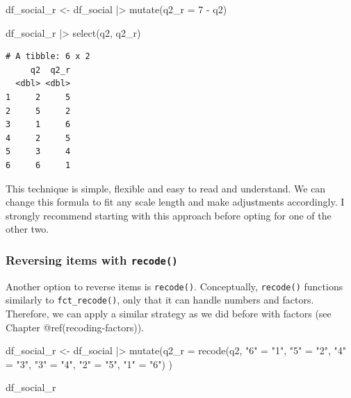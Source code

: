 \documentclass[
  letterpaper,
]{krantz}
\makeatletter
\newenvironment{Shaded}{\begin{snugshade}}{\end{snugshade}}
\newcommand{\AttributeTok}[1]{\textcolor[rgb]{0.40,0.45,0.13}{#1}}
\newcommand{\DecValTok}[1]{\textcolor[rgb]{0.68,0.00,0.00}{#1}}
\newcommand{\FunctionTok}[1]{\textcolor[rgb]{0.28,0.35,0.67}{#1}}
\newcommand{\NormalTok}[1]{\textcolor[rgb]{0.00,0.23,0.31}{#1}}
\newcommand{\OtherTok}[1]{\textcolor[rgb]{0.00,0.23,0.31}{#1}}
\newcommand{\SpecialCharTok}[1]{\textcolor[rgb]{0.37,0.37,0.37}{#1}}
\newcommand{\StringTok}[1]{\textcolor[rgb]{0.13,0.47,0.30}{#1}}
\newenvironment{kframe}{%
\medskip{}
\setlength{\fboxsep}{.8em}
 \def\at@end@of@kframe{}%
 \ifinner\ifhmode%
  \def\at@end@of@kframe{\end{minipage}}%
  \begin{minipage}{\columnwidth}%
 \fi\fi%
 \def\FrameCommand##1{\hskip\@totalleftmargin \hskip-\fboxsep
 \colorbox{shadecolor}{##1}\hskip-\fboxsep
     \hskip-\linewidth \hskip-\@totalleftmargin \hskip\columnwidth}%
 \MakeFramed {\advance\hsize-\width
   \@totalleftmargin\z@ \linewidth\hsize
   \@setminipage}}%
 {\par\unskip\endMakeFramed%
 \at@end@of@kframe}
\renewenvironment{Shaded}{\begin{kframe}}{\end{kframe}}
\makeatother
\begin{document}
\begin{Shaded}
\begin{Highlighting}[]
\NormalTok{df\_social\_r }\OtherTok{\textless{}{-}}
\NormalTok{  df\_social }\SpecialCharTok{|\textgreater{}}
  \FunctionTok{mutate}\NormalTok{(}\AttributeTok{q2\_r =} \DecValTok{7} \SpecialCharTok{{-}}\NormalTok{ q2)}

\NormalTok{df\_social\_r }\SpecialCharTok{|\textgreater{}}
  \FunctionTok{select}\NormalTok{(q2, q2\_r)}
\end{Highlighting}
\end{Shaded}

\begin{verbatim}
# A tibble: 6 x 2
     q2  q2_r
  <dbl> <dbl>
1     2     5
2     5     2
3     1     6
4     2     5
5     3     4
6     6     1
\end{verbatim}

This technique is simple, flexible and easy to read and understand. We
can change this formula to fit any scale length and make adjustments
accordingly. I strongly recommend starting with this approach before
opting for one of the other two.

\subsubsection{\texorpdfstring{Reversing items with
\texttt{recode()}}{Reversing items with recode()}}\label{sec-reversing-items-recode}

Another option to reverse items is \texttt{recode()}. Conceptually,
\texttt{recode()} functions similarly to \texttt{fct\_recode()}, only
that it can handle numbers and factors. Therefore, we can apply a
similar strategy as we did before with factors (see Chapter
@ref(recoding-factors)).

\begin{Shaded}
\begin{Highlighting}[]
\NormalTok{df\_social\_r }\OtherTok{\textless{}{-}}
\NormalTok{  df\_social }\SpecialCharTok{|\textgreater{}}
  \FunctionTok{mutate}\NormalTok{(}\AttributeTok{q2\_r =} \FunctionTok{recode}\NormalTok{(q2,}
                       \StringTok{"6"} \OtherTok{=} \StringTok{"1"}\NormalTok{,}
                       \StringTok{"5"} \OtherTok{=} \StringTok{"2"}\NormalTok{,}
                       \StringTok{"4"} \OtherTok{=} \StringTok{"3"}\NormalTok{,}
                       \StringTok{"3"} \OtherTok{=} \StringTok{"4"}\NormalTok{,}
                       \StringTok{"2"} \OtherTok{=} \StringTok{"5"}\NormalTok{,}
                       \StringTok{"1"} \OtherTok{=} \StringTok{"6"}\NormalTok{)}
\NormalTok{         )}

\NormalTok{df\_social\_r}
\end{Highlighting}
\end{Shaded}
\end{document}

